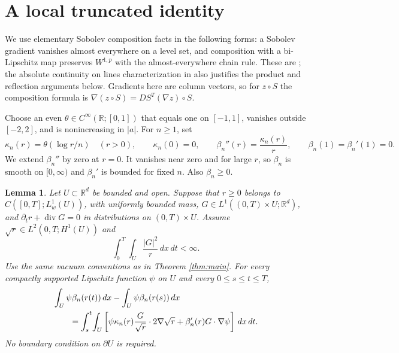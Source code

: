 \documentclass[11pt]{article}
\newtheorem{lemma}[theorem]{Lemma}
\newcommand{\R}{\mathbb R}
\newcommand{\dd}{\,dx}
\newcommand{\dt}{\,dt}
\newcommand{\grad}{\nabla}
\newcommand{\Div}{\operatorname{div}}
\begin{document}
\section{A local truncated identity}\label{sec:local}
We use elementary Sobolev composition facts in the following forms: a
Sobolev gradient vanishes almost everywhere on a level set, and composition
with a bi-Lipschitz map preserves $W^{1,p}$ with the almost-everywhere chain
rule. These are \cite[Corollary 21 and Theorem 31]{H}; the absolute continuity
on lines characterization in \cite[Theorem 18]{H} also justifies the product
and reflection arguments below. Gradients here are column vectors, so for
$z\circ S$ the composition formula is
$\grad(z\circ S)=DS^T(\grad z)\circ S$.

Choose an even $\theta\in C^\infty(\R;[0,1])$ that equals one on
$[-1,1]$, vanishes outside $[-2,2]$, and is nonincreasing in $|a|$.
For $n\geq1$, set
\begin{equation}\label{eq:truncation}
 \kappa_n(r)=\theta(\log r/n)\quad(r>0),\qquad \kappa_n(0)=0,
 \qquad \beta_n''(r)=\frac{\kappa_n(r)}r,
 \qquad \beta_n(1)=\beta_n'(1)=0.
\end{equation}
We extend $\beta_n''$ by zero at $r=0$. It vanishes near zero and for large
$r$, so $\beta_n$ is smooth on $[0,\infty)$ and $\beta_n'$ is bounded for
fixed $n$. Also $\beta_n\geq0$.

\begin{lemma}\label{lem:local}
Let $U\subset\R^d$ be bounded and open. Suppose that
$r\geq0$ belongs to $C([0,T];L^1_w(U))$, with uniformly bounded mass,
$G\in L^1((0,T)\times U;\R^d)$, and
$\partial_t r+\Div G=0$ in distributions on $(0,T)\times U$.
Assume $\sqrt r\in L^2(0,T;H^1(U))$ and
\[
 \int_0^T\!\int_U\frac{|G|^2}{r}\dd\dt<\infty.
\]
Use the same vacuum conventions as in Theorem \ref{thm:main}.
For every compactly supported Lipschitz function $\psi$ on $U$ and every
$0\leq s\leq t\leq T$,
\begin{align}\label{eq:local}
 &\int_U\psi\beta_n(r(t))\dd-\int_U\psi\beta_n(r(s))\dd\notag\\
 &\qquad=\int_s^t\!\int_U\left[
    \psi\kappa_n(r)\frac{G}{\sqrt r}\cdot2\grad\sqrt r
       +\beta_n'(r)G\cdot\grad\psi\right]\dd\dt.
\end{align}
No boundary condition on $\partial U$ is required.
\end{lemma}
\end{document}
